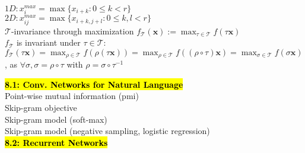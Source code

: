 \documentclass[10pt,landscape]{article}
\begin{document}
\begin{multicols*}{3}
{\begin{minipage}{\linewidth}
$1D: x^{max}_i = \max\{x_{i+k}:0\leq k < r\}$\\
$2D: x^{max}_{ij} = \max\{x_{i+k,j+l}:0\leq k,l < r\}$ \\
$\mathcal{T}$-invariance through maximization $f_\mathcal{T}(\mathbf{x}):=\max_{\tau\in\mathcal{T}}f(\tau \mathbf{x})$ \\
$f_\mathcal{T}$ is invariant under $\tau\in\mathcal{T}$: $f_\mathcal{T}(\tau\mathbf{x})=\max_{\rho\in\mathcal{T}}f(\rho(\tau\mathbf{x}))=
\max_{\rho\in\mathcal{T}}f((\rho\circ\tau)\mathbf{x})=\max_{\sigma\in\mathcal{T}}f(\sigma \mathbf{x})$,
as $\forall \sigma, \sigma=\rho\circ\tau$ with $\rho=\sigma\circ\tau^{-1}$
\end{minipage}}
\hl{\textbf{8.1: Conv. Networks for Natural Language}}\\
Point-wise mutual information (pmi)\\
Skip-gram objective\\
Skip-gram model (soft-max)\\
Skip-gram model (negative sampling, logistic regression)\\
\hl{ \textbf{8.2: Recurrent Networks}}\\
\end{multicols*}
\end{document}
